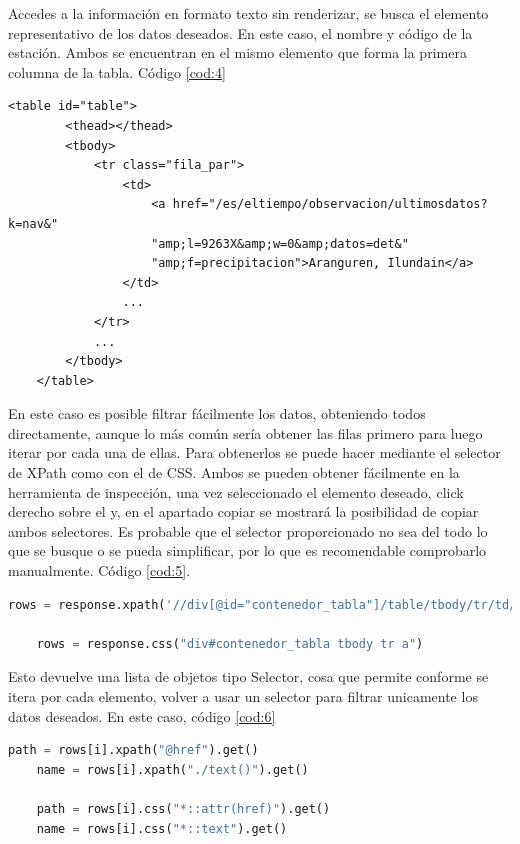 Accedes a la información en formato texto sin renderizar, se busca el elemento representativo de los datos deseados. En este caso, el nombre y código de la estación. Ambos se encuentran en el mismo elemento que forma la primera columna de la tabla. Código \ref{cod:4}

\begin{lstlisting}[caption={Estructura HTML de los datos deseados Aemet. Los puntos suspensivos de las líneas 10 y 12 representan código omitido.}, label=cod:4]
	<table id="table">
		<thead></thead>
		<tbody>
			<tr class="fila_par">
				<td>
					<a href="/es/eltiempo/observacion/ultimosdatos?k=nav&"
					"amp;l=9263X&amp;w=0&amp;datos=det&"
					"amp;f=precipitacion">Aranguren, Ilundain</a>
				</td>
				...
			</tr>
			...
		</tbody>
	</table>
\end{lstlisting}

En este caso es posible filtrar fácilmente los datos, obteniendo todos directamente, aunque lo más común sería obtener las filas primero para luego iterar por cada una de ellas. Para obtenerlos se puede hacer mediante el selector de XPath como con el de CSS.\newline
\newline
Ambos se pueden obtener fácilmente en la herramienta de inspección, una vez seleccionado el elemento deseado, click derecho sobre el y, en el apartado copiar se mostrará la posibilidad de copiar ambos selectores. Es probable que el selector proporcionado no sea del todo lo que se busque o se pueda simplificar, por lo que es recomendable comprobarlo manualmente. Código \ref{cod:5}.

\begin{lstlisting}[language=Python, caption={Selectores posibles para la obtención de los datos de código y nombre de estación en Aemet}, label=cod:5]
	rows = response.xpath('//div[@id="contenedor_tabla"]/table/tbody/tr/td/a')
	
	rows = response.css("div#contenedor_tabla tbody tr a")
\end{lstlisting}

Esto devuelve una lista de objetos tipo Selector, cosa que permite conforme se itera por cada elemento, volver a usar un selector para filtrar unicamente los datos deseados. En este caso, código \ref{cod:6}

\begin{lstlisting}[language=Python, caption={Selectores posibles para el filtrado de los datos de código y nombre de estación en Aemet}, label=cod:6]
	path = rows[i].xpath("@href").get()
	name = rows[i].xpath("./text()").get()
	
	path = rows[i].css("*::attr(href)").get()
	name = rows[i].css("*::text").get()
\end{lstlisting}

